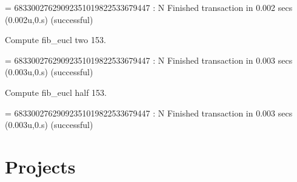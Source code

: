 \begin{Coqanswer}
    = 68330027629092351019822533679447
     : N
Finished transaction in 0.002 secs (0.002u,0.s) (successful)
\end{Coqanswer}

\begin{Coqsrc}
Compute fib_eucl two 153.
\end{Coqsrc}

\begin{Coqanswer}
    = 68330027629092351019822533679447
     : N
Finished transaction in 0.003 secs (0.003u,0.s) (successful)
\end{Coqanswer}

\begin{Coqsrc}
Compute fib_eucl half 153.
\end{Coqsrc}

\begin{Coqanswer}
    = 68330027629092351019822533679447
     : N
Finished transaction in 0.003 secs (0.003u,0.s) (successful)
\end{Coqanswer}


\section{Projects}

